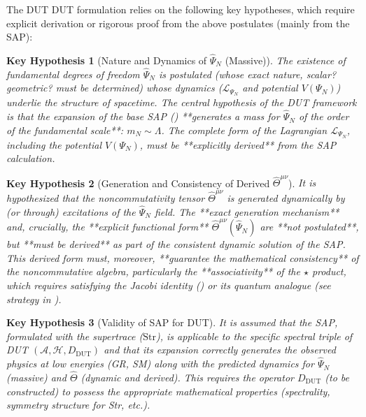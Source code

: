 \documentclass[11pt, a4paper]{article}
\newtheorem{hypothesis}{Key Hypothesis}[section]
\theoremstyle{remark}
\newcommand{\Op}[1]{\hat{#1}}
\newcommand{\Str}{\mathrm{Str}}
\begin{document}
The DUT DUT formulation relies on the following key hypotheses, which require explicit derivation or rigorous proof from the above postulates (mainly from the SAP):

\begin{hypothesis}[Nature and Dynamics of \texorpdfstring{$\Op{\Psi}_N$}{PsiN} (Massive)]
    \label{hyp:psi_n_final}
    The existence of fundamental degrees of freedom \( \Op{\Psi}_N \) is postulated (whose exact nature, scalar? geometric? must be determined) whose dynamics (\(\mathcal{L}_{\Psi_N}\) and potential \(V(\Psi_N)\)) underlie the structure of spacetime. The central hypothesis of the DUT framework is that the expansion of the base SAP () **generates a mass for \( \Op{\Psi}_N \) of the order of the fundamental scale**: \( m_N \sim \Lambda \). The complete form of the Lagrangian \( \mathcal{L}_{\Psi_N} \), including the potential \(V(\Psi_N)\), must be **explicitly derived** from the SAP calculation.
\end{hypothesis}

\begin{hypothesis}[Generation and Consistency of Derived \texorpdfstring{$\Op{\Theta}^{\mu\nu}$}{Theta}]
    \label{hyp:theta_gen_final}
    It is hypothesized that the noncommutativity tensor \( \Op{\Theta}^{\mu\nu} \) is generated dynamically by (or through) excitations of the \( \Op{\Psi}_N \) field. The **exact generation mechanism** and, crucially, the **explicit functional form** \( \Op{\Theta}^{\mu\nu}(\Op{\Psi}_N) \) are **not postulated**, but **must be derived** as part of the consistent dynamic solution of the SAP. This derived form must, moreover, **guarantee the mathematical consistency** of the noncommutative algebra, particularly the **associativity** of the \( \star \) product, which requires satisfying the Jacobi identity () or its quantum analogue (see strategy in ).
\end{hypothesis}

\begin{hypothesis}[Validity of SAP for DUT]
    \label{hyp:pae_validity_final}
    It is assumed that the SAP, formulated with the supertrace (\( \Str \)), is applicable to the specific spectral triple of DUT \((\mathcal{A}, \mathcal{H}, D_{\text{DUT}})\) and that its expansion correctly generates the observed physics at low energies (GR, SM) along with the predicted dynamics for \( \Op{\Psi}_N \) (massive) and \( \Op{\Theta} \) (dynamic and derived). This requires the operator \( D_{\text{DUT}} \) (to be constructed) to possess the appropriate mathematical properties (spectrality, symmetry structure for Str, etc.).
\end{hypothesis}
\end{document}

